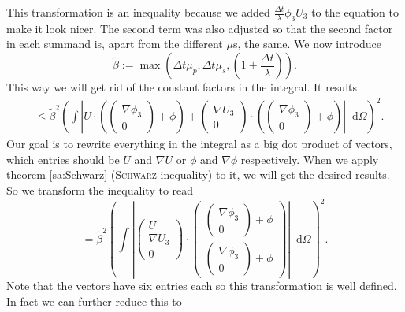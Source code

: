 \documentclass[12pt,a4paper,twoside, open=right]{scrreprt}
\theoremstyle{definition}
\theoremstyle{plain}
\newcommand{\abs}[1]{\left\vert #1\right\vert}
\newcommand{\D}{\mathop{}\!\mathrm{d}}
\begin{document}
This transformation is an inequality because we added $\frac{\Delta t}{\lambda}\phi_3U_3$ to the equation to make it look nicer. The second term was also adjusted so that the second factor in each summand is, apart from the different $\mu$s, the same. We now introduce 
\begin{equation}
    \tilde\beta:=\max\left(\Delta t\mu_p,\Delta t\mu_s,\left(1+\frac{\Delta t}{\lambda}\right)\right).
\end{equation}
This way we will get rid of the constant factors in the integral. It results
\begin{align}
&\le \tilde\beta^2\left(\int \abs{U\cdot\left(\begin{pmatrix}
\nabla\phi_3\\0
\end{pmatrix}+\phi\right)+\begin{pmatrix}
\nabla U_3\\0
\end{pmatrix}\cdot\left(\begin{pmatrix}
\nabla\phi_3\\0
\end{pmatrix}+\phi\right)}\D\Omega\right)^2.
\end{align}
Our goal is to rewrite everything in the integral as a big dot product of vectors, which entries should be $U$ and $\nabla U$ or $\phi$ and $\nabla \phi$ respectively. When we apply theorem \ref{sa:Schwarz} (\textsc{Schwarz} inequality) to it, we will get the desired results. So we transform the inequality to read
\begin{equation}
    = \tilde\beta^2\left(\int\abs{\begin{pmatrix}
        U\\ \nabla U_3\\0
        \end{pmatrix}\cdot\begin{pmatrix}
        \begin{pmatrix}
        \nabla\phi_3\\0\end{pmatrix}+\phi
        \\\begin{pmatrix}
        \nabla\phi_3\\0\end{pmatrix}+\phi
        \end{pmatrix}}\D\Omega\right)^2.
\end{equation}
Note that the vectors have six entries each so this transformation is well defined. In fact we can further reduce this to
\end{document}
